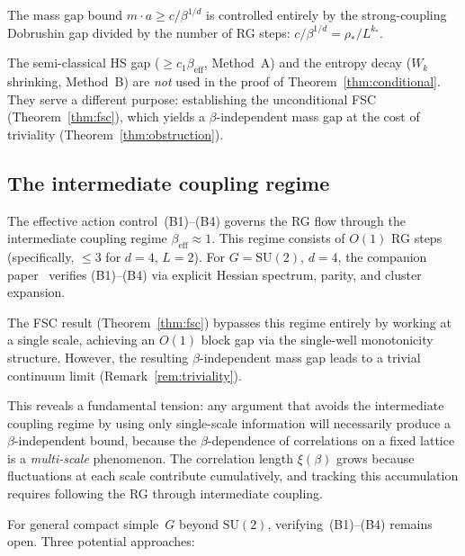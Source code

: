 \documentclass[11pt,a4paper]{article}
\theoremstyle{plain}
\theoremstyle{definition}
\theoremstyle{remark}
\newcommand{\SU}{\mathrm{SU}}
\begin{document}
The mass gap bound $m \cdot a \geq c/\beta^{1/d}$ is
controlled entirely by the strong-coupling Dobrushin gap
divided by the number of RG steps:
$c/\beta^{1/d} = \rho_* / L^{k_*}$.

The semi-classical HS gap
($\geq c_1\beta_{\mathrm{eff}}$, Method~A) and
the entropy decay ($W_k$ shrinking, Method~B) are
\emph{not} used in the proof of
Theorem~\ref{thm:conditional}.  They serve a different
purpose: establishing the unconditional FSC
(Theorem~\ref{thm:fsc}), which yields a
$\beta$-independent mass gap at the cost of triviality
(Theorem~\ref{thm:obstruction}).

\subsection{The intermediate coupling regime}

The effective action control~(B1)--(B4) governs the RG flow
through the
intermediate coupling regime $\beta_{\mathrm{eff}} \approx 1$.
This regime consists of $O(1)$ RG steps
(specifically, $\leq 3$ for $d = 4$, $L = 2$).
For $G = \SU(2)$, $d = 4$, the companion
paper~\cite{FontesSU2} verifies (B1)--(B4) via explicit
Hessian spectrum, parity, and cluster expansion.

The FSC result (Theorem~\ref{thm:fsc}) bypasses this
regime entirely by working at a single scale, achieving
an $O(1)$ block gap via the single-well monotonicity
structure.  However, the resulting $\beta$-independent mass
gap leads to a trivial continuum limit
(Remark~\ref{rem:triviality}).

This reveals a fundamental tension: any argument that
avoids the intermediate coupling regime by using only
single-scale information will necessarily produce a
$\beta$-independent bound, because the $\beta$-dependence
of correlations on a fixed lattice is a \emph{multi-scale}
phenomenon.  The correlation length $\xi(\beta)$ grows
because fluctuations at each scale contribute cumulatively,
and tracking this accumulation requires following the RG
through intermediate coupling.

For general compact simple~$G$ beyond $\SU(2)$,
verifying~(B1)--(B4) remains open.
Three potential approaches:
\end{document}
